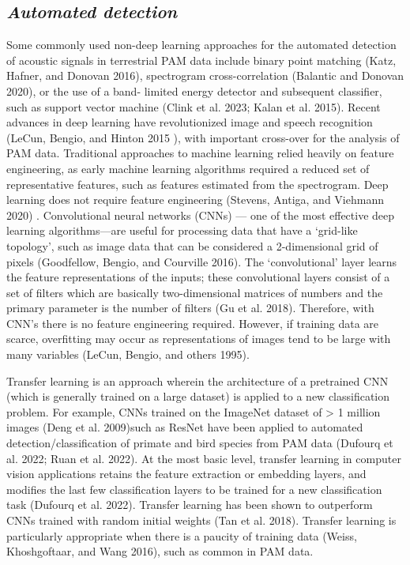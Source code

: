 \documentclass{article}
\begin{document}
\hypertarget{automated-detection}{%
\subsection{\texorpdfstring{\emph{Automated
detection}}{Automated detection}}\label{automated-detection}}

Some commonly used non-deep learning approaches for the automated
detection of acoustic signals in terrestrial PAM data include binary
point matching (Katz, Hafner, and Donovan 2016), spectrogram
cross-correlation (Balantic and Donovan 2020), or the use of a band-
limited energy detector and subsequent classifier, such as support
vector machine (Clink et al. 2023; Kalan et al. 2015). Recent advances
in deep learning have revolutionized image and speech recognition
(LeCun, Bengio, and Hinton 2015 ), with important cross-over for the
analysis of PAM data. Traditional approaches to machine learning relied
heavily on feature engineering, as early machine learning algorithms
required a reduced set of representative features, such as features
estimated from the spectrogram. Deep learning does not require feature
engineering (Stevens, Antiga, and Viehmann 2020) . Convolutional neural
networks (CNNs) --- one of the most effective deep learning
algorithms---are useful for processing data that have a `grid-like
topology', such as image data that can be considered a 2-dimensional
grid of pixels (Goodfellow, Bengio, and Courville 2016). The
`convolutional' layer learns the feature representations of the inputs;
these convolutional layers consist of a set of filters which are
basically two-dimensional matrices of numbers and the primary parameter
is the number of filters (Gu et al. 2018). Therefore, with CNN's there
is no feature engineering required. However, if training data are
scarce, overfitting may occur as representations of images tend to be
large with many variables (LeCun, Bengio, and others 1995).

Transfer learning is an approach wherein the architecture of a
pretrained CNN (which is generally trained on a large dataset) is
applied to a new classification problem. For example, CNNs trained on
the ImageNet dataset of \textgreater{} 1 million images (Deng et al.
2009)such as ResNet have been applied to automated
detection/classification of primate and bird species from PAM data
(Dufourq et al. 2022; Ruan et al. 2022). At the most basic level,
transfer learning in computer vision applications retains the feature
extraction or embedding layers, and modifies the last few classification
layers to be trained for a new classification task (Dufourq et al.
2022). Transfer learning has been shown to outperform CNNs trained with
random initial weights (Tan et al. 2018). Transfer learning is
particularly appropriate when there is a paucity of training data
(Weiss, Khoshgoftaar, and Wang 2016), such as common in PAM data.
\end{document}
